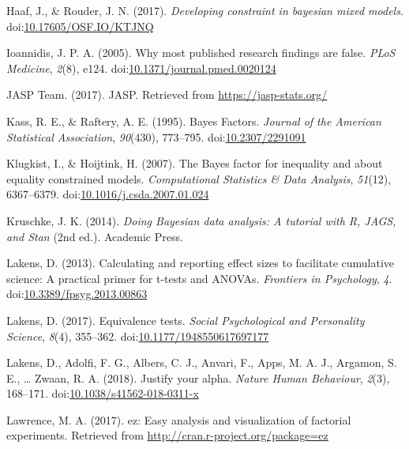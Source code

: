 \documentclass[,man, mask]{apa6}
\theoremstyle{definition}
\theoremstyle{definition}
\theoremstyle{definition}
\theoremstyle{remark}
\begin{document}
\hypertarget{ref-Haaf2017}{}
Haaf, J., \& Rouder, J. N. (2017). \emph{Developing constraint in
bayesian mixed models}.
doi:\href{https://doi.org/10.17605/OSF.IO/KTJNQ}{10.17605/OSF.IO/KTJNQ}

\hypertarget{ref-Ioannidis2005}{}
Ioannidis, J. P. A. (2005). Why most published research findings are
false. \emph{PLoS Medicine}, \emph{2}(8), e124.
doi:\href{https://doi.org/10.1371/journal.pmed.0020124}{10.1371/journal.pmed.0020124}

\hypertarget{ref-JASPTeam2017}{}
JASP Team. (2017). JASP. Retrieved from \url{https://jasp-stats.org/}

\hypertarget{ref-Kass1995a}{}
Kass, R. E., \& Raftery, A. E. (1995). Bayes Factors. \emph{Journal of
the American Statistical Association}, \emph{90}(430), 773--795.
doi:\href{https://doi.org/10.2307/2291091}{10.2307/2291091}

\hypertarget{ref-Klugkist2007}{}
Klugkist, I., \& Hoijtink, H. (2007). The Bayes factor for inequality
and about equality constrained models. \emph{Computational Statistics \&
Data Analysis}, \emph{51}(12), 6367--6379.
doi:\href{https://doi.org/10.1016/j.csda.2007.01.024}{10.1016/j.csda.2007.01.024}

\hypertarget{ref-Kruschke2014}{}
Kruschke, J. K. (2014). \emph{Doing Bayesian data analysis: A tutorial
with R, JAGS, and Stan} (2nd ed.). Academic Press.

\hypertarget{ref-Lakens2013}{}
Lakens, D. (2013). Calculating and reporting effect sizes to facilitate
cumulative science: A practical primer for t-tests and ANOVAs.
\emph{Frontiers in Psychology}, \emph{4}.
doi:\href{https://doi.org/10.3389/fpsyg.2013.00863}{10.3389/fpsyg.2013.00863}

\hypertarget{ref-Lakens2017a}{}
Lakens, D. (2017). Equivalence tests. \emph{Social Psychological and
Personality Science}, \emph{8}(4), 355--362.
doi:\href{https://doi.org/10.1177/1948550617697177}{10.1177/1948550617697177}

\hypertarget{ref-Lakens2017}{}
Lakens, D., Adolfi, F. G., Albers, C. J., Anvari, F., Apps, M. A. J.,
Argamon, S. E., \ldots{} Zwaan, R. A. (2018). Justify your alpha.
\emph{Nature Human Behaviour}, \emph{2}(3), 168--171.
doi:\href{https://doi.org/10.1038/s41562-018-0311-x}{10.1038/s41562-018-0311-x}

\hypertarget{ref-Lawrence2017}{}
Lawrence, M. A. (2017). ez: Easy analysis and visualization of factorial
experiments. Retrieved from \url{http://cran.r-project.org/package=ez}
\end{document}
